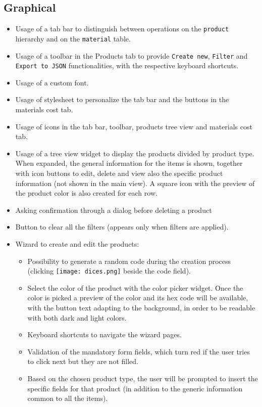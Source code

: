 \documentclass[10pt]{article}
\begin{document}
\subsection{Graphical}
\begin{itemize}
    \item Usage of a tab bar to distinguish between operations on the \texttt{product}
          hierarchy and on the \texttt{material} table.
    \item Usage of a toolbar in the Products tab to provide \texttt{Create new},
          \texttt{Filter} and \texttt{Export to JSON} functionalities, with the
          respective keyboard shortcuts.
    \item Usage of a custom font.
    \item Usage of stylesheet to personalize the tab bar and the buttons in the materials
          cost tab.
    \item Usage of icons in the tab bar, toolbar, products tree view and materials cost
          tab.
    \item Usage of a tree view widget to display the products divided by product type.
          When expanded, the general information for the items is shown, together with
          icon buttons to edit, delete and view also the specific product information
          (not shown in the main view). A square icon with the preview of the product
          color is also created for each row.
    \item Asking confirmation through a dialog before deleting a product
    \item Button to clear all the filters (appears only when filters are applied).
          \pagebreak
    \item Wizard to create and edit the products:
          \begin{itemize}
              \item Possibility to generate a random code during the creation process (clicking
                    \texttt{[image: dices.png]} beside the code
                    field).
              \item Select the color of the product with the color picker widget. Once the color is
                    picked a preview of the color and its hex code will be available, with the
                    button text adapting to the background, in order to be readable with both dark
                    and light colors.
              \item Keyboard shortcuts to navigate the wizard pages.
              \item Validation of the mandatory form fields, which turn red if the user tries to
                    click next but they are not filled.
              \item Based on the chosen product type, the user will be prompted to insert the
                    specific fields for that product (in addition to the generic information common
                    to all the items).
          \end{itemize}

\end{itemize}
\newpage
\end{document}
